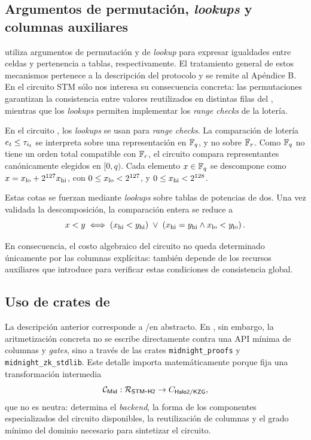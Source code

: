 \subsection{Argumentos de permutación, \textit{lookups} y columnas auxiliares}
\label{subsec:stm-halo2-y-complejidad-argumentos-de-permutacion-lookups-y-columnas-auxiliares}

\HaloTwo utiliza argumentos de permutación y de \textit{lookup} para expresar igualdades entre celdas y pertenencia a tablas, respectivamente. El tratamiento general de estos mecanismos pertenece a la descripción del protocolo y se remite al Apéndice B. En el circuito STM sólo nos interesa su consecuencia concreta: las permutaciones garantizan la consistencia entre valores reutilizados en distintas filas del \Layout, mientras que los \textit{lookups} permiten implementar los \textit{range checks} de la lotería.

En el circuito \STM, los \textit{lookups} se usan para \textit{range checks}. La comparación de lotería $e_t \le \tau_{i_t}$ se interpreta sobre una representación en $\mathbb{F}_q$, y no sobre $\mathbb{F}_r$. Como $\mathbb{F}_q$ no tiene un orden total compatible con $\mathbb{F}_r$, el circuito compara representantes canónicamente elegidos en \([0,q)\). Cada elemento $x \in \mathbb{F}_q$ se descompone como $x = {x}_{\mathrm{lo}} + 2^{127}{x}_{\mathrm{hi}}$, con $0 \le {x}_{\mathrm{lo}} < 2^{127}$, y $0 \le {x}_{\mathrm{hi}} < 2^{128}$.

Estas cotas se fuerzan mediante \textit{lookups} sobre tablas de potencias de dos. Una vez validada la descomposición, la comparación entera se reduce a
$$x < y \iff \left({x}_{\mathrm{hi}} < {y}_{\mathrm{hi}} \right) \;\vee\; \left({x}_{\mathrm{hi}} = {y}_{\mathrm{hi}} \wedge {x}_{\mathrm{lo}} < {y}_{\mathrm{lo}}\right).$$

En consecuencia, el costo algebraico del circuito no queda determinado únicamente por las columnas explícitas: también depende de los recursos auxiliares que \HaloTwo introduce para verificar estas condiciones de consistencia global.

\subsection{Uso de crates de \texorpdfstring{\textnormal{\Midnight}}{Midnight}}
\label{subsec:stm-halo2-y-complejidad-uso-de-crates-de-midnight}

La descripción anterior corresponde a \HaloTwo/\KZG en abstracto. En \Mithril, sin embargo, la aritmetización concreta no se escribe directamente contra una API mínima de columnas y \textit{gates}, sino a través de las crates \texttt{midnight\_proofs} y \texttt{midnight\_zk\_stdlib}. Este detalle importa matemáticamente porque fija una transformación intermedia
$$\mathcal{C}_{\mathsf{Mid}}: \mathcal{R}_{\mathsf{STM\mbox{-}H2}} \to C_{\mathsf{Halo2/KZG}},$$
que no es neutra: determina el \textit{backend}, la forma de los componentes especializados del circuito disponibles, la reutilización de columnas y el grado mínimo del dominio necesario para sintetizar el circuito.

